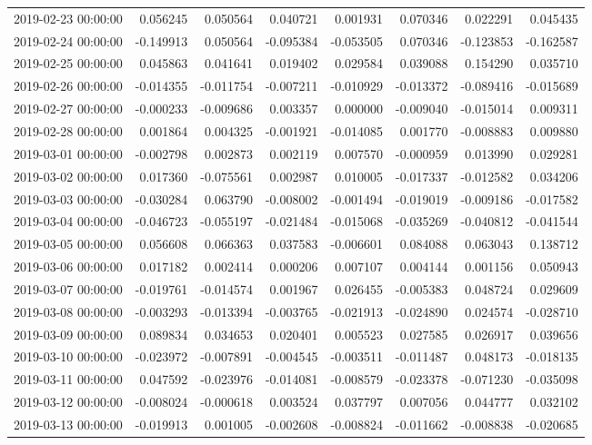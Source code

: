 \begin{tabular}{lrrrrrrr}
2019-02-23 00:00:00 & 0.056245 & 0.050564 & 0.040721 & 0.001931 & 0.070346 & 0.022291 & 0.045435 \\
2019-02-24 00:00:00 & -0.149913 & 0.050564 & -0.095384 & -0.053505 & 0.070346 & -0.123853 & -0.162587 \\
2019-02-25 00:00:00 & 0.045863 & 0.041641 & 0.019402 & 0.029584 & 0.039088 & 0.154290 & 0.035710 \\
2019-02-26 00:00:00 & -0.014355 & -0.011754 & -0.007211 & -0.010929 & -0.013372 & -0.089416 & -0.015689 \\
2019-02-27 00:00:00 & -0.000233 & -0.009686 & 0.003357 & 0.000000 & -0.009040 & -0.015014 & 0.009311 \\
2019-02-28 00:00:00 & 0.001864 & 0.004325 & -0.001921 & -0.014085 & 0.001770 & -0.008883 & 0.009880 \\
2019-03-01 00:00:00 & -0.002798 & 0.002873 & 0.002119 & 0.007570 & -0.000959 & 0.013990 & 0.029281 \\
2019-03-02 00:00:00 & 0.017360 & -0.075561 & 0.002987 & 0.010005 & -0.017337 & -0.012582 & 0.034206 \\
2019-03-03 00:00:00 & -0.030284 & 0.063790 & -0.008002 & -0.001494 & -0.019019 & -0.009186 & -0.017582 \\
2019-03-04 00:00:00 & -0.046723 & -0.055197 & -0.021484 & -0.015068 & -0.035269 & -0.040812 & -0.041544 \\
2019-03-05 00:00:00 & 0.056608 & 0.066363 & 0.037583 & -0.006601 & 0.084088 & 0.063043 & 0.138712 \\
2019-03-06 00:00:00 & 0.017182 & 0.002414 & 0.000206 & 0.007107 & 0.004144 & 0.001156 & 0.050943 \\
2019-03-07 00:00:00 & -0.019761 & -0.014574 & 0.001967 & 0.026455 & -0.005383 & 0.048724 & 0.029609 \\
2019-03-08 00:00:00 & -0.003293 & -0.013394 & -0.003765 & -0.021913 & -0.024890 & 0.024574 & -0.028710 \\
2019-03-09 00:00:00 & 0.089834 & 0.034653 & 0.020401 & 0.005523 & 0.027585 & 0.026917 & 0.039656 \\
2019-03-10 00:00:00 & -0.023972 & -0.007891 & -0.004545 & -0.003511 & -0.011487 & 0.048173 & -0.018135 \\
2019-03-11 00:00:00 & 0.047592 & -0.023976 & -0.014081 & -0.008579 & -0.023378 & -0.071230 & -0.035098 \\
2019-03-12 00:00:00 & -0.008024 & -0.000618 & 0.003524 & 0.037797 & 0.007056 & 0.044777 & 0.032102 \\
2019-03-13 00:00:00 & -0.019913 & 0.001005 & -0.002608 & -0.008824 & -0.011662 & -0.008838 & -0.020685 \\

\end{tabular}
